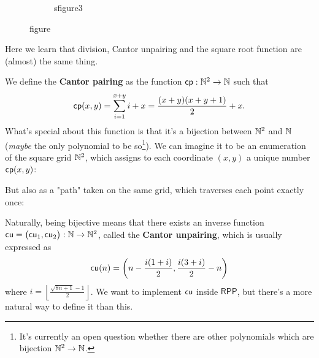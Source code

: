 \documentclass[runningheads]{llncs}
\newcommand{\RPP}{\textsf{RPP}\xspace}
\begin{document}
\begin{figure}
\begin{subfigure}{.3\textwidth}
\caption{sfigure3}
\label{sfig:3}
\end{subfigure}
\caption{figure}
\label{fig:}
\end{figure}

Here we learn that division, Cantor unpairing and the square root function are (almost) the same thing.

We define the \textbf{Cantor pairing} as the function $\mathsf{cp} : \mathbb{N}^2 \to \mathbb{N}$ such that
\[ \mathsf{cp}(x,y)= \sum_{i=1}^{x+y}i + x = \frac{(x + y)(x + y + 1)}{2} + x.\]
What's special about this function is that it's a bijection between $\mathbb{N}^2$ and $\mathbb{N}$
(\textit{maybe} the only polynomial to be so\footnote{It's currently an open question
    whether there are other polynomials which are bijection $\mathbb{N}^2 \to \mathbb{N}$.}).
We can imagine it to be an enumeration of the square grid $\mathbb{N}^2$,
which assigns to each coordinate $(x,y)$ a unique number $\mathsf{cp}(x,y)$:


But also as a "path" taken on the same grid, which traverses each point exactly once:


Naturally, being bijective means that there exists an inverse function $\mathsf{cu} = \big( \mathsf{cu}_1, \mathsf{cu}_2 \big) : \mathbb{N} \to \mathbb{N}^2$,
called the \textbf{Cantor unpairing}, which is usually expressed as
\[ \mathsf{cu}(n) = \left( n - \frac{i(1+i)}{2}, \frac{i(3+i)}{2} - n \right) \]
where $i = \left\lfloor \frac{\sqrt{8n + 1} - 1}{2} \right\rfloor $.
We want to implement $\mathsf{cu}$ inside $\RPP$, but there's a more natural way to define it than this.
\end{document}
